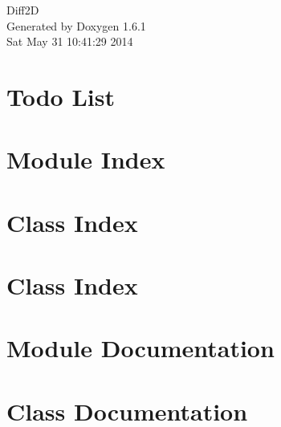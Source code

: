 \documentclass[a4paper]{book}
\begin{document}
\hypersetup{pageanchor=false}
\begin{titlepage}
\vspace*{7cm}
\begin{center}
{\Large Diff2D }\\
\vspace*{1cm}
{\large Generated by Doxygen 1.6.1}\\
\vspace*{0.5cm}
{\small Sat May 31 10:41:29 2014}\\
\end{center}
\end{titlepage}
\clearemptydoublepage
{}
\tableofcontents
\clearemptydoublepage
{}
\hypersetup{pageanchor=true}
\chapter{Todo List}
\label{todo}
\hypertarget{todo}{}

\chapter{Module Index}

\chapter{Class Index}

\chapter{Class Index}

\chapter{Module Documentation}

\chapter{Class Documentation}














\printindex
\end{document}
